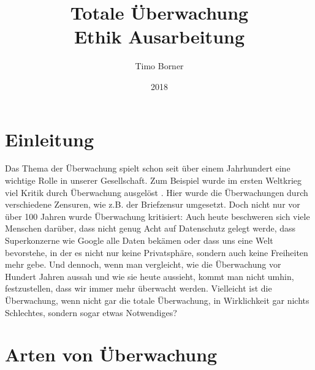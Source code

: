 \documentclass{article}
\title{Totale Überwachung \\ Ethik Ausarbeitung}
\author{Timo Borner}
\date{2018}
\begin{document}
\maketitle
\newpage

\section{Einleitung}
Das Thema der Überwachung spielt schon seit über einem Jahrhundert eine wichtige Rolle in unserer Gesellschaft. Zum Beispiel wurde im ersten Weltkrieg viel Kritik durch Überwachung ausgelöst \cite{Pressefreiheit}.
Hier wurde die Überwachungen durch verschiedene Zensuren, wie z.B. der Briefzensur \cite{Zensur} umgesetzt. Doch nicht nur vor über 100 Jahren wurde Überwachung kritisiert: Auch heute beschweren sich viele Menschen darüber, dass nicht genug Acht auf Datenschutz gelegt werde, dass Superkonzerne wie Google alle Daten bekämen oder dass uns eine Welt bevorstehe, in der es nicht nur keine Privatsphäre, sondern auch keine Freiheiten mehr gebe. Und dennoch, wenn man vergleicht, wie die Überwachung vor Hundert Jahren aussah und wie sie heute aussieht, kommt man nicht umhin, festzustellen, dass wir immer mehr überwacht werden. Vielleicht ist die Überwachung, wenn nicht gar die totale Überwachung, in Wirklichkeit gar nichts Schlechtes, sondern sogar etwas Notwendiges?

\section{Arten von Überwachung}

\newpage
\printbibliography
\end{document}
